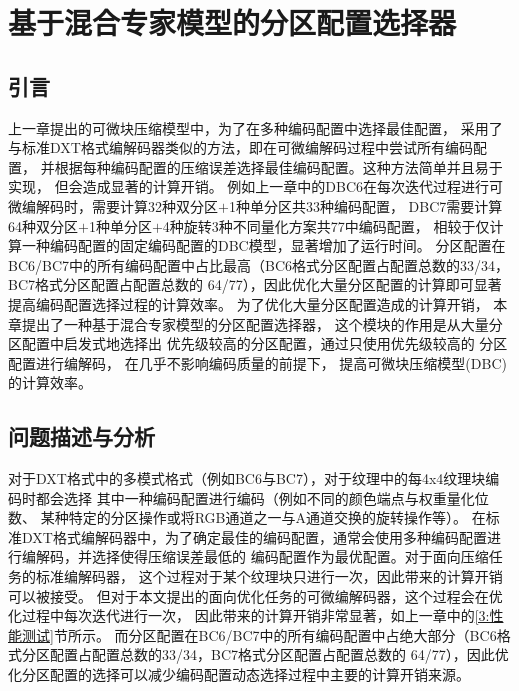 
\chapter{基于混合专家模型的分区配置选择器}

\section{引言}

上一章提出的可微块压缩模型中，为了在多种编码配置中选择最佳配置，
采用了与标准DXT格式编解码器类似的方法，即在可微编解码过程中尝试所有编码配置，
并根据每种编码配置的压缩误差选择最佳编码配置。这种方法简单并且易于实现，
但会造成显著的计算开销。
例如上一章中的DBC6在每次迭代过程进行可微编解码时，需要计算32种双分区$+$1种单分区共33种编码配置，
DBC7需要计算64种双分区$+$1种单分区$+$4种旋转\times3种不同量化方案共77中编码配置，
相较于仅计算一种编码配置的固定编码配置的DBC模型，显著增加了运行时间。
分区配置在BC6/BC7中的所有编码配置中占比最高（BC6格式分区配置占配置总数的33/34，BC7格式分区配置占配置总数的
64/77），因此优化大量分区配置的计算即可显著提高编码配置选择过程的计算效率。
为了优化大量分区配置造成的计算开销，
本章提出了一种基于混合专家模型的分区配置选择器，
这个模块的作用是从大量分区配置中启发式地选择出
优先级较高的分区配置，通过只使用优先级较高的
分区配置进行编解码，
在几乎不影响编码质量的前提下，
提高可微块压缩模型(DBC)的计算效率。

\section{问题描述与分析}

对于DXT格式中的多模式格式（例如BC6与BC7），对于纹理中的每4x4纹理块编码时都会选择
其中一种编码配置进行编码（例如不同的颜色端点与权重量化位数、
某种特定的分区操作或将RGB通道之一与A通道交换的旋转操作等）。
在标准DXT格式编解码器中，为了确定最佳的编码配置，通常会使用多种编码配置进行编解码，并选择使得压缩误差最低的
编码配置作为最优配置。对于面向压缩任务的标准编解码器，
这个过程对于某个纹理块只进行一次，因此带来的计算开销可以被接受。
但对于本文提出的面向优化任务的可微编解码器，这个过程会在优化过程中每次迭代进行一次，
因此带来的计算开销非常显著，如上一章中的\ref{3:性能测试}节所示。
而分区配置在BC6/BC7中的所有编码配置中占绝大部分（BC6格式分区配置占配置总数的33/34，BC7格式分区配置占配置总数的
64/77），因此优化分区配置的选择可以减少编码配置动态选择过程中主要的计算开销来源。

